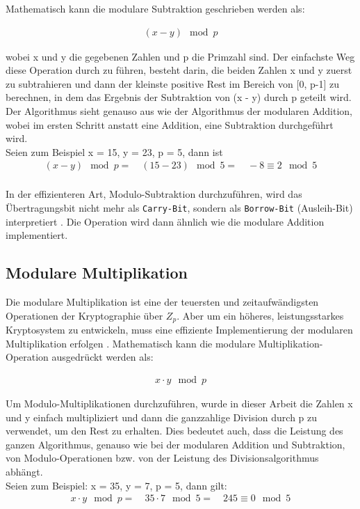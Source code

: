 Mathematisch kann die modulare Subtraktion geschrieben
werden als: 
\begin{ceqn}
\begin{align*}
                     (x - y) \mod p 
\end{align*}
\end{ceqn} 

wobei x und y die gegebenen Zahlen und p die Primzahl sind. 
Der einfachste Weg diese Operation durch zu führen, besteht darin, die beiden Zahlen x
und y zuerst zu subtrahieren und dann der kleinste positive Rest im Bereich von [0, p-1] zu berechnen, in dem das Ergebnis
der Subtraktion von (x - y) durch p geteilt wird. Der Algorithmus sieht genauso aus wie der Algorithmus der modularen Addition, wobei im ersten Schritt anstatt eine Addition, eine Subtraktion durchgeführt wird. \\

Seien zum Beispiel x = 15, y = 23, p = 5, dann ist
\begin{align*}
    (x - y) \mod p = \quad (15-23) \mod 5 = \quad -8 \equiv 2 \mod 5 \\
\end{align*}

In der effizienteren Art, Modulo-Subtraktion durchzuführen, wird das Übertragungsbit nicht mehr als \texttt{Carry-Bit}, sondern als \texttt{Borrow-Bit} (Ausleih-Bit) interpretiert \cite{nist}. Die Operation wird dann ähnlich wie die modulare Addition implementiert.  

\subsection{Modulare Multiplikation}


Die modulare Multiplikation ist eine der teuersten und zeitaufwändigsten
Operationen der Kryptographie über $ Z_p$. Aber um ein höheres, leistungsstarkes Kryptosystem zu entwickeln,
muss eine effiziente Implementierung der modularen Multiplikation erfolgen \cite{Hossain2019}. 
Mathematisch kann die modulare Multiplikation-Operation ausgedrückt werden als:

\begin{ceqn}

\begin{align*}
           x \cdot y \mod p
\end{align*} 

\end{ceqn}

Um Modulo-Multiplikationen durchzuführen, wurde in dieser Arbeit die Zahlen x und y einfach multipliziert und dann die ganzzahlige Division durch p zu verwendet, um den Rest zu erhalten.
Dies bedeutet auch, dass die Leistung des ganzen Algorithmus, genauso wie bei der modularen Addition und Subtraktion, von Modulo-Operationen bzw. von der Leistung des Divisionsalgorithmus abhängt. \\
Seien zum Beispiel: x = 35, y = 7, p = 5, dann gilt:
\begin{align*}
    x \cdot y \mod p = \quad 35 \cdot 7 \mod 5 = \quad 245 \equiv 0 \mod 5 \\
\end{align*}

